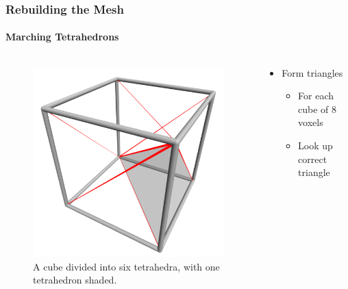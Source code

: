 \documentclass{beamer}
\begin{document}
	\begin{frame}
	\frametitle{Rebuilding the Mesh}
	\framesubtitle{Marching Tetrahedrons}
		\begin{columns}[T] %
			\begin{column}[T]{5cm} %
				\begin{figure}
					\centerline{\includegraphics[scale=0.3]{MarchingEx.png}}
					\caption{A cube divided into six tetrahedra, with one tetrahedron shaded.}
				\end{figure}
			\end{column}
			\begin{column}[T]{5cm} %
				\begin{itemize}
				\item{Form triangles}
					\begin{itemize}
						\item{For each cube of 8 voxels}
						\item{Look up correct triangle}
					\end{itemize}
				\end{itemize}
			\end{column}
		\end{columns}
	\end{frame}
\end{document}

